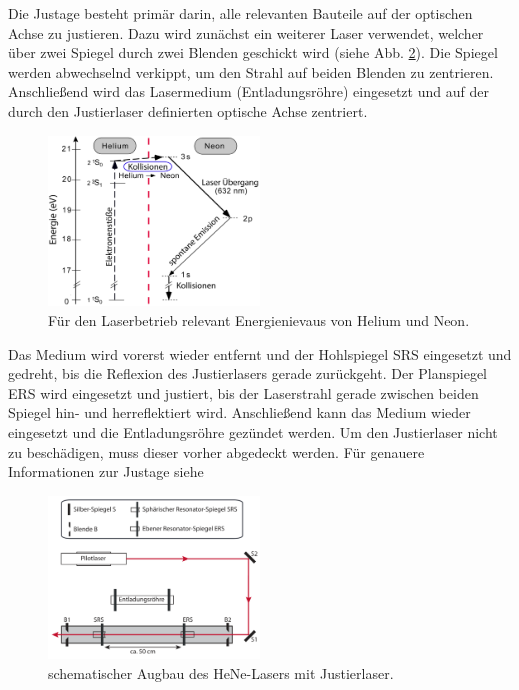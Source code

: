 \documentclass{article}
\begin{document}
Die Justage besteht primär darin, alle relevanten Bauteile auf der optischen Achse zu justieren.
Dazu wird zunächst ein weiterer Laser verwendet, welcher über zwei Spiegel durch zwei Blenden geschickt
wird (siehe Abb. \ref{fig:aufbau}). Die Spiegel werden abwechselnd verkippt, um den Strahl auf beiden Blenden zu zentrieren.
Anschließend wird das Lasermedium (Entladungsröhre) eingesetzt und auf der durch den Justierlaser definierten optische Achse zentriert.

\begin{figure}[h]
  \centering
  \includegraphics[width=0.5\textwidth]{hene-level}
  \caption{Für den Laserbetrieb relevant Energienievaus von Helium und Neon. \cite{Anleitung}}
  \label{fig:hene-level}
\end{figure}

Das Medium wird vorerst wieder entfernt und der Hohlspiegel SRS eingesetzt und gedreht,
bis die Reflexion des Justierlasers gerade zurückgeht.
Der Planspiegel ERS wird eingesetzt und justiert, bis der Laserstrahl gerade zwischen beiden Spiegel hin- und herreflektiert wird.
Anschließend kann das Medium wieder eingesetzt und die Entladungsröhre gezündet werden.
Um den Justierlaser nicht zu beschädigen, muss dieser vorher abgedeckt werden. Für genauere Informationen zur Justage
siehe \cite[Abschnitt 5.2]{Anleitung}


\begin{figure}[h]
  \centering
  \includegraphics[width=0.5\textwidth]{aufbau}
  \caption{schematischer Augbau des HeNe-Lasers mit Justierlaser. \cite{Anleitung}}
  \label{fig:aufbau}
\end{figure}
\end{document}

